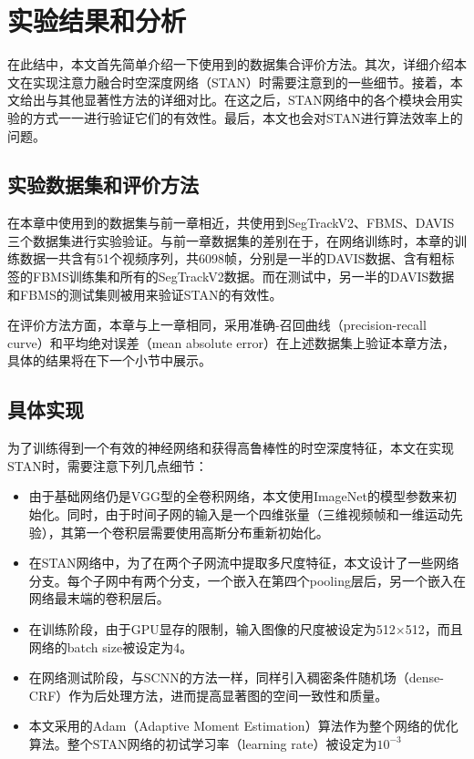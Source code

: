 \section{实验结果和分析}
在此结中，本文首先简单介绍一下使用到的数据集合评价方法。其次，详细介绍本文在实现注意力融合时空深度网络（STAN）时需要注意到的一些细节。接着，本文给出与其他显著性方法的详细对比。在这之后，STAN网络中的各个模块会用实验的方式一一进行验证它们的有效性。最后，本文也会对STAN进行算法效率上的问题。

\subsection{实验数据集和评价方法}
在本章中使用到的数据集与前一章相近，共使用到SegTrackV2、FBMS、DAVIS三个数据集进行实验验证。与前一章数据集的差别在于，在网络训练时，本章的训练数据一共含有51个视频序列，共6098帧，分别是一半的DAVIS数据、含有粗标签的FBMS训练集和所有的SegTrackV2数据。而在测试中，另一半的DAVIS数据和FBMS的测试集则被用来验证STAN的有效性。

在评价方法方面，本章与上一章相同，采用准确-召回曲线（precision-recall curve）和平均绝对误差（mean absolute error）在上述数据集上验证本章方法，具体的结果将在下一个小节中展示。

\subsection{具体实现}
为了训练得到一个有效的神经网络和获得高鲁棒性的时空深度特征，本文在实现STAN时，需要注意下列几点细节：
\begin{itemize}
  \item 由于基础网络仍是VGG型的全卷积网络，本文使用ImageNet的模型参数来初始化。同时，由于时间子网的输入是一个四维张量（三维视频帧和一维运动先验），其第一个卷积层需要使用高斯分布重新初始化。
  \item 在STAN网络中，为了在两个子网流中提取多尺度特征，本文设计了一些网络分支。每个子网中有两个分支，一个嵌入在第四个pooling层后，另一个嵌入在网络最末端的卷积层后。
  \item 在训练阶段，由于GPU显存的限制，输入图像的尺度被设定为512$\times$512，而且网络的batch size被设定为4。
  \item 在网络测试阶段，与SCNN的方法一样，同样引入稠密条件随机场（dense-CRF）\cite{chen2014semantic}作为后处理方法，进而提高显著图的空间一致性和质量。
  \item 本文采用的Adam（Adaptive Moment Estimation）算法作为整个网络的优化算法。整个STAN网络的初试学习率（learning rate）被设定为$10^{-3}$
\end{itemize}


